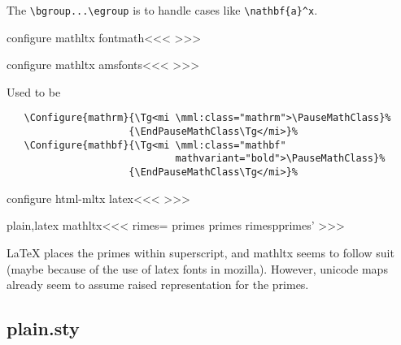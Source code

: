 {{The \verb+\bgroup...\egroup+ is to handle cases like
\verb+\nathbf{a}^x+.



\<configure mathltx fontmath\><<<
\def\bold:version{bold}
%
  {\bgroup {}}%
  {\egroup }%
%
  {\bgroup {}}%
  {\egroup }%
%
  {\bgroup {}}%
  {\egroup }%
%
  {\bgroup {}}%
  {\egroup }%
%
  {\bgroup {}}%
  {\egroup }%
>>>

\<configure mathltx amsfonts\><<<  
>>>



Used to be

\begin{verbatim}
   \Configure{mathrm}{\Tg<mi \mml:class="mathrm">\PauseMathClass}%
                     {\EndPauseMathClass\Tg</mi>}%
   \Configure{mathbf}{\Tg<mi \mml:class="mathbf"
                             mathvariant="bold">\PauseMathClass}%
                     {\EndPauseMathClass\Tg</mi>}%
\end{verbatim}


\<configure html-mltx latex\><<<
>>>





\<plain,latex mathltx\><<<
   {\let\:primes=\empty}
   {\def\:tempa{\prime\prime}\ifx \:tempa\:primes
              \else
      \def\:tempa{\prime\prime\prime}\ifx \:tempa\:primes
              \else
              \fi\fi
   }
   {\xdef\:primes{\:primes'}}
>>>

LaTeX places the primes within superscript, and mathltx seems to follow
suit (maybe because of the use of latex fonts in mozilla). However,
unicode maps already seem to assume raised representation for the
primes.

\subsection{plain.sty}




}}
